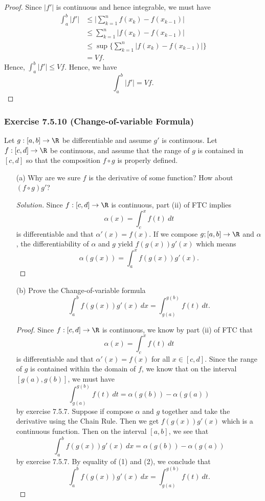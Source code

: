 \begin{enumerate}
\begin{proof}
		Since \( | f' |  \) is continuous and hence integrable, we must have
		\begin{align*}
		    \int_{ a }^{ b } | f' | &\leq \Big| \sum_{ k=1 }^{n } f(x_{k}) - f(x_{k-1}) \Big|  \\
									&\leq \sum_{ k=1 }^{ n }| f(x_{k }) - f(x_{k-1})  | \\
									&\leq \sup \Big\{ \sum_{ k=1 }^{ n }| f(x_{k }) - f(x_{k-1})  | \Big\}  \\
									&= Vf.
		\end{align*}
		Hence, \( \int_{ a }^{ b } | f' | \leq Vf \). Hence, we have 
		\[  \int_{ a }^{ b } | f' | = Vf  . \]
		\end{proof}
\end{enumerate}


\subsubsection{Exercise 7.5.10 (Change-of-variable Formula)} Let \( g: [a,b] \to \R  \) be differentiable and assume \( g' \) is continuous. Let \( f: [c,d] \to \R  \) be continuous, and assume that the range of \( g  \) is contained in \( [c,d]  \) so that the composition \( f \circ g  \) is properly defined.
\begin{enumerate}
    \item[(a)] Why are we sure \( f  \) is the derivative of some function? How about \( (f \circ g ) g' \)? 
		\begin{proof}[Solution]
	    Since \( f: [c,d] \to \R  \) is continuous, part (ii) of FTC implies 
        \[ \alpha(x) = \int_{ c }^{ x } f(t)  \ dt \] is differentiable and that \( \alpha'(x) = f(x)  \). If we compose \( g;[a,b]  \to \R  \) and \( \alpha  \), the differentiability of \( \alpha  \) and \( g  \) yield \( f(g(x)) g'(x)   \) which means 
        \[  \alpha(g(x)) = \int_{ a }^{ x } f(g(x)) g'(x). \] 
		\end{proof}
	\item[(b)] Prove the Change-of-variable formula
		\[  \int_{ a }^{ b } f(g(x)) g'(x) \    dx = \int_{ g(a) }^{ g(b) } f(t) \  dt. \]
		\begin{proof}
            Since \( f: [c,d] \to \R   \) is continuous, we know by part (ii) of FTC that 
            \[  \alpha(x) = \int_{ c }^{ x} f(t) \ dt \]
            is differentiable and that \( \alpha'(x) = f(x)   \) for all \( x \in [c,d] \). Since the range of \( g \) is contained within the domain of \( f  \), we know that on the interval \( [g(a), g(b)] \), we must have 
            \[  \int_{ g(a)  }^{ g(b)  } f(t) \  dt = \alpha( g(b)) - \alpha( g(a))  \tag{1} \] by exercise 7.5.7. Suppose if compose \( \alpha  \) and \( g \) together and take the derivative using the Chain Rule. Then we get \( f(g(x)) g'(x)  \) which is a continuous function. Then on the interval \( [a,b]  \), we see that
            \[  \int_{ a }^{ b } f(g(x)) g'(x) \  dx = \alpha(g(b)) - \alpha(g(a)) \tag{2} \]
            by exercise 7.5.7. By equality of (1) and (2), we conclude that
            \[  \int_{ a }^{ b } f(g(x)) g'(x) \   dx = \int_{ g(a)  }^{ g(b)  } f(t) \  dt. \]
		\end{proof}
\end{enumerate}


